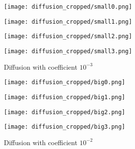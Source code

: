 \begin{figure}[H]
    \centering
    
    \begin{minipage}[t]{.24\linewidth}
        \centering
        \vspace{0pt}
        \texttt{[image: diffusion\_cropped/small0.png]}
    \end{minipage}
    \begin{minipage}[t]{.24\linewidth}
        \centering
        \vspace{0pt}
        \texttt{[image: diffusion\_cropped/small1.png]}
    \end{minipage}
    \begin{minipage}[t]{.24\linewidth}
        \centering
        \vspace{0pt}
        \texttt{[image: diffusion\_cropped/small2.png]}
    \end{minipage}
    \begin{minipage}[t]{.24\linewidth}
        \centering
        \vspace{0pt}
        \texttt{[image: diffusion\_cropped/small3.png]}
    \end{minipage}

    \caption{Diffusion with coefficient $10^{-3}$}
    \label{fig diffusion 1e-3}
\end{figure}



\begin{figure}[H]
    \centering
    
    \begin{minipage}[t]{.24\linewidth}
        \centering
        \vspace{0pt}
        \texttt{[image: diffusion\_cropped/big0.png]}
    \end{minipage}
    \begin{minipage}[t]{.24\linewidth}
        \centering
        \vspace{0pt}
        \texttt{[image: diffusion\_cropped/big1.png]}
    \end{minipage}
    \begin{minipage}[t]{.24\linewidth}
        \centering
        \vspace{0pt}
        \texttt{[image: diffusion\_cropped/big2.png]}
    \end{minipage}
    \begin{minipage}[t]{.24\linewidth}
        \centering
        \vspace{0pt}
        \texttt{[image: diffusion\_cropped/big3.png]}
    \end{minipage}

    \caption{Diffusion with coefficient $10^{-2}$}
    \label{fig diffusion 1e-2}
\end{figure}

